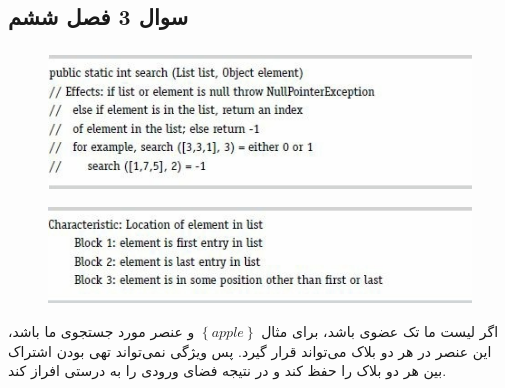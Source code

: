 \documentclass{article}
\begin{document}


\newpage

\section{}%
\subsection{سوال 3 فصل ششم}
\subsubsection{}
\begin{figure}[H]
    \centering
    \includegraphics[width=1.0\textwidth]{figures/1a.jpg}
    \caption
	{}
    \label{fig:fig1}
\end{figure}
\begin{figure}[H]
    \centering
    \includegraphics[width=1.0\textwidth]{figures/1b.jpg}
    \caption
	{}
    \label{fig:fig1}
\end{figure}
اگر لیست ما تک عضوی باشد، برای مثال $\left\{ apple \right\}$ و عنصر مورد جستجوی ما  باشد، این عنصر در هر دو بلاک می‌تواند قرار گیرد. پس ویژگی  نمی‌تواند تهی بودن اشتراک بین هر دو بلاک را حفظ کند و در نتیجه فضای ورودی را به درستی افراز کند.
\end{document}

